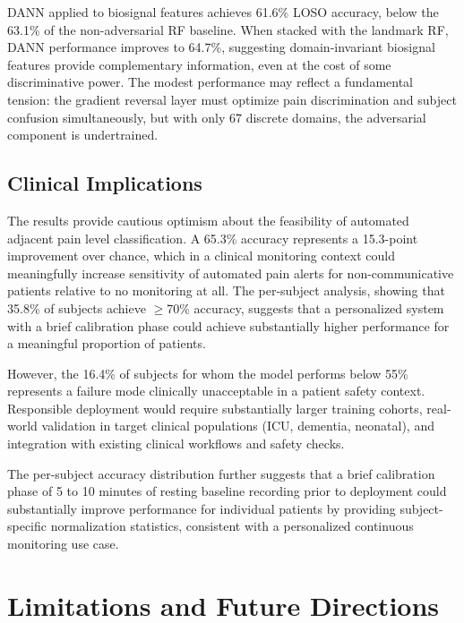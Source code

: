 \documentclass[10pt, twocolumn]{article}
\begin{document}
DANN applied to biosignal features achieves 61.6\% LOSO accuracy, below the 63.1\% of
the non-adversarial RF baseline. When stacked with the landmark RF, DANN performance
improves to 64.7\%, suggesting domain-invariant biosignal features provide complementary
information, even at the cost of some discriminative power. The modest performance may
reflect a fundamental tension: the gradient reversal layer must optimize pain
discrimination and subject confusion simultaneously, but with only 67 discrete domains,
the adversarial component is undertrained.

\subsection{Clinical Implications}

The results provide cautious optimism about the feasibility of automated adjacent pain
level classification. A 65.3\% accuracy represents a 15.3-point improvement over chance,
which in a clinical monitoring context could meaningfully increase sensitivity of automated
pain alerts for non-communicative patients relative to no monitoring at all. The per-subject
analysis, showing that 35.8\% of subjects achieve $\geq$70\% accuracy, suggests that a
personalized system with a brief calibration phase could achieve substantially higher
performance for a meaningful proportion of patients.

However, the 16.4\% of subjects for whom the model performs below 55\% represents a
failure mode clinically unacceptable in a patient safety context. Responsible deployment
would require substantially larger training cohorts, real-world validation in target
clinical populations (ICU, dementia, neonatal), and integration with existing clinical
workflows and safety checks.

The per-subject accuracy distribution further suggests that a brief calibration phase of
5 to 10 minutes of resting baseline recording prior to deployment could substantially
improve performance for individual patients by providing subject-specific normalization
statistics, consistent with a personalized continuous monitoring use case.

\section{Limitations and Future Directions}
\label{sec:limitations}
\end{document}
